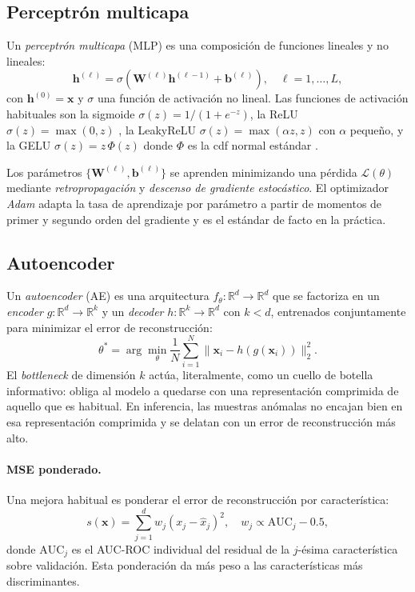 \subsection{Perceptrón multicapa}

Un \emph{perceptrón multicapa} (MLP) es una composición de funciones lineales y no lineales:
\begin{equation}
\bm{h}^{(\ell)} = \sigma\!\left( \bm{W}^{(\ell)} \bm{h}^{(\ell-1)} + \bm{b}^{(\ell)} \right), \quad \ell = 1, \ldots, L,
\label{eq:mlp}
\end{equation}
con $\bm{h}^{(0)} = \bm{x}$ y $\sigma$ una función de activación no lineal. Las funciones de activación habituales son la sigmoide $\sigma(z) = 1/(1+e^{-z})$, la ReLU $\sigma(z) = \max(0,z)$ \cite{nair2010relu}, la LeakyReLU $\sigma(z) = \max(\alpha z, z)$ con $\alpha$ pequeño, y la GELU $\sigma(z) = z\,\Phi(z)$ donde $\Phi$ es la cdf normal estándar \cite{hendrycks2016gelu}.

Los parámetros $\{\bm{W}^{(\ell)}, \bm{b}^{(\ell)}\}$ se aprenden minimizando una pérdida $\mathcal{L}(\theta)$ mediante \emph{retropropagación} \cite{rumelhart1986backprop} y \emph{descenso de gradiente estocástico}. El optimizador \emph{Adam} \cite{kingma2014adam} adapta la tasa de aprendizaje por parámetro a partir de momentos de primer y segundo orden del gradiente y es el estándar de facto en la práctica.

\subsection{Autoencoder}

Un \emph{autoencoder} (AE) \cite{hinton2006reducing} es una arquitectura $f_\theta: \mathbb{R}^d \to \mathbb{R}^d$ que se factoriza en un \emph{encoder} $g: \mathbb{R}^d \to \mathbb{R}^k$ y un \emph{decoder} $h: \mathbb{R}^k \to \mathbb{R}^d$ con $k < d$, entrenados conjuntamente para minimizar el error de reconstrucción:
\begin{equation}
\theta^* = \arg\min_\theta \frac{1}{N} \sum_{i=1}^{N} \| \bm{x}_i - h(g(\bm{x}_i)) \|_2^2.
\label{eq:ae-loss}
\end{equation}
El \textit{bottleneck} de dimensión $k$ actúa, literalmente, como un cuello de botella informativo: obliga al modelo a quedarse con una representación comprimida de aquello que es habitual. En inferencia, las muestras anómalas no encajan bien en esa representación comprimida y se delatan con un error de reconstrucción más alto.

\paragraph{MSE ponderado.} Una mejora habitual es ponderar el error de reconstrucción por característica:
\begin{equation}
s(\bm{x}) = \sum_{j=1}^{d} w_j (x_j - \hat x_j)^2, \quad w_j \propto \mathrm{AUC}_j - 0.5,
\label{eq:weighted-mse}
\end{equation}
donde $\mathrm{AUC}_j$ es el AUC-ROC individual del residual de la $j$-ésima característica sobre validación. Esta ponderación da más peso a las características más discriminantes.

